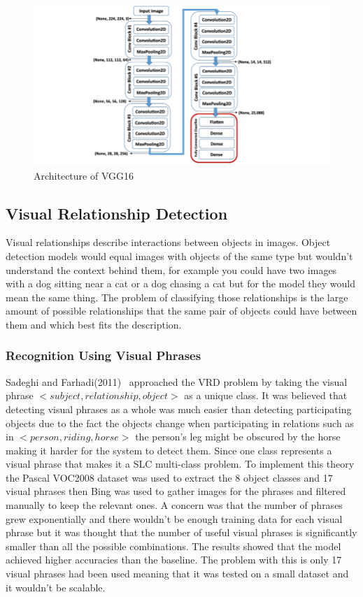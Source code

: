 \documentclass{csfyp}
\begin{document}
\begin{figure}[!htbp]
\includegraphics[scale=0.50,center]{VGG16Blocks.pdf}
\caption{Architecture of VGG16}
\end{figure}

\subsection{Visual Relationship Detection}
Visual relationships describe interactions between objects in images. Object detection models would equal images with objects of the same type but wouldn't understand the context behind them, for example you could have two images with a dog sitting near a cat or a dog chasing a cat but for the model they would mean the same thing. The problem of classifying those relationships is the large amount of possible relationships that the same pair of objects could have between them and which best fits the description. 


\subsubsection{Recognition Using Visual Phrases}
Sadeghi and Farhadi(2011)~\cite{VisualPhrases} approached the VRD problem by taking the visual phrase $<subject, relationship , object>$ as a unique class. It was believed that detecting visual phrases as a whole was much easier than detecting participating objects due to the fact the objects change when participating in relations such as in $<person,riding,horse>$ the person’s leg might be obscured by the horse making it harder for the system to detect them. Since one class represents a visual phrase that makes it a SLC multi-class problem. To implement this theory the Pascal VOC2008 dataset was used to extract the 8 object classes and 17 visual phrases then Bing was used to gather images for the phrases and filtered manually to keep the relevant ones.  A concern was that the number of phrases grew exponentially and there wouldn’t be enough training data for each visual phrase but it was thought that the number of useful visual phrases is significantly smaller than all the possible combinations. The results showed that the model achieved higher accuracies than the baseline. The problem with this is only 17 visual phrases had been used meaning that it was tested on a small dataset and it wouldn’t be scalable.
\end{document}
